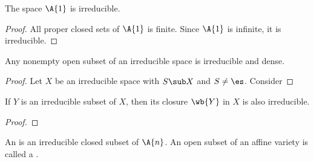 \documentclass[10pt]{article}
\begin{document}
\begin{example}
    The space $\A{1}$ is irreducible.
\end{example}
\begin{proof}
    All proper closed sets of $\A{1}$ is finite. Since $\A{1}$ is infinite, it is irreducible.
\end{proof}
\begin{example}
    Any nonempty open subset of an irreducible space is irreducible and dense.
\end{example}
\begin{proof}
    Let $X$ be an irreducible space with $S\sub X$ and $S\ne\es$. Consider 
\end{proof}
\begin{example}
    If $Y$ is an irreducible subset of $X$, then its closure $\wb{Y}$ in $X$ is also irreducible.
\end{example}
\begin{proof}
    
\end{proof}
\begin{definition}
    An  is an irreducible closed subset of $\A{n}$. An open subset of an affine variety is called a .
\end{definition}








\hindex
\end{document}
